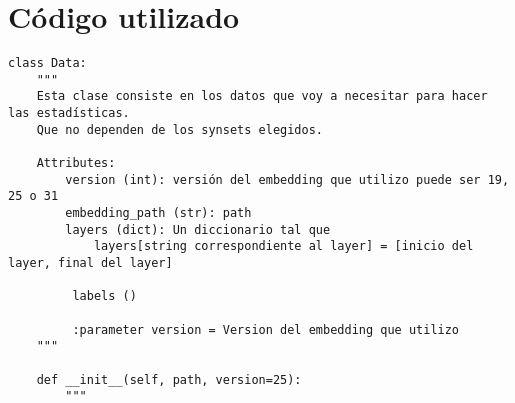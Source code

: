 \documentclass[12,twoside]{TFG-GM}
\theoremstyle{definition}
\theoremstyle{remark}
\begin{document}
\appendix
\vfill\newpage \section{Código utilizado}
\begin{verbatim}
class Data:
    """
    Esta clase consiste en los datos que voy a necesitar para hacer las estadísticas.
    Que no dependen de los synsets elegidos.

    Attributes:
        version (int): versión del embedding que utilizo puede ser 19, 25 o 31
        embedding_path (str): path
        layers (dict): Un diccionario tal que
            layers[string correspondiente al layer] = [inicio del layer, final del layer]

         labels ()

         :parameter version = Version del embedding que utilizo
    """

    def __init__(self, path, version=25):
        """


\end{verbatim}
\end{document}
